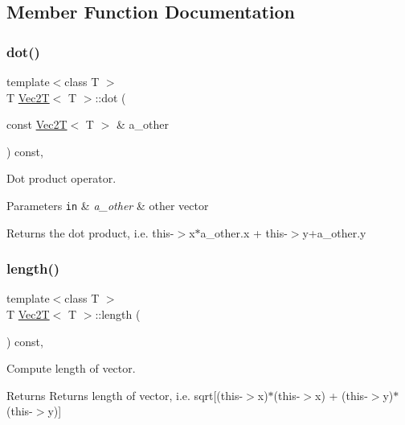 \subsection{Member Function Documentation}
\mbox{\label{classVec2T_ab7ed0195847b7a1037051402967780a3}} 
\subsubsection{\texorpdfstring{dot()}{dot()}}
{\footnotesize\ttfamily template$<$class T $>$ \\
T \hyperlink{classVec2T}{Vec2T}$<$ T $>$\+::dot (\begin{DoxyParamCaption}\item[{const \hyperlink{classVec2T}{Vec2T}$<$ T $>$ \&}]{a\+\_\+other }\end{DoxyParamCaption}) const\hspace{0.3cm}{\ttfamily [inline]}, {\ttfamily [noexcept]}}



Dot product operator. 


\begin{DoxyParams}[1]{Parameters}
\mbox{\tt in}  & {\em a\+\_\+other} & other vector\\
\hline
\end{DoxyParams}
Returns the dot product, i.\+e. this-\/$>$x$\ast$a\+\_\+other.x + this-\/$>$y+a\+\_\+other.y \mbox{\label{classVec2T_ad7965b8d549a5f9d08cab43760dab56b}} 
\subsubsection{\texorpdfstring{length()}{length()}}
{\footnotesize\ttfamily template$<$class T $>$ \\
T \hyperlink{classVec2T}{Vec2T}$<$ T $>$\+::length (\begin{DoxyParamCaption}{ }\end{DoxyParamCaption}) const\hspace{0.3cm}{\ttfamily [inline]}, {\ttfamily [noexcept]}}



Compute length of vector. 

\begin{DoxyReturn}{Returns}
Returns length of vector, i.\+e. sqrt\mbox{[}(this-\/$>$x)$\ast$(this-\/$>$x) + (this-\/$>$y)$\ast$(this-\/$>$y)\mbox{]} 
\end{DoxyReturn}
\mbox{\label{classVec2T_a9beb3ae1b8b76926f8864686cb6a2ace}} 
